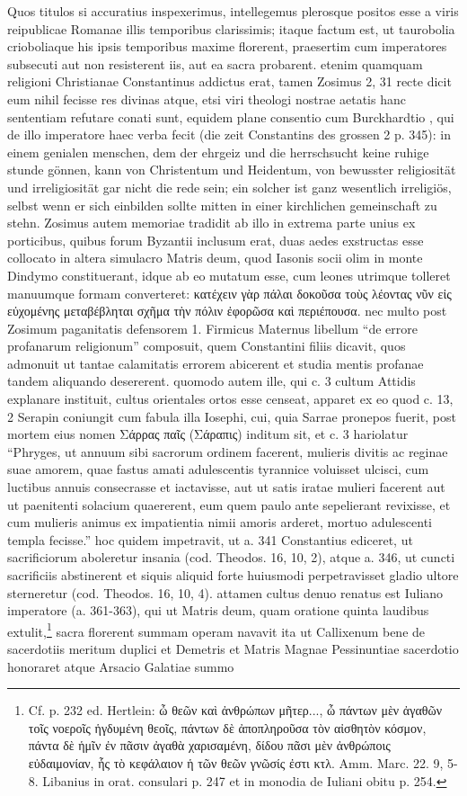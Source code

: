 \documentclass[a4paper, 11pt, oneside, polutonikogreek, german]{article}
\begin{document}
Quos titulos si accuratius inspexerimus, intellegemus plerosque positos esse a viris reipublicae Romanae illis temporibus clarissimis; itaque factum est, ut taurobolia crioboliaque his ipsis temporibus maxime florerent, praesertim cum imperatores subsecuti aut non resisterent iis, aut ea sacra probarent. etenim quamquam religioni Christianae Constantinus addictus erat, tamen Zosimus 2, 31 recte dicit eum nihil fecisse res divinas atque, etsi viri theologi nostrae aetatis hanc sententiam refutare conati sunt, equidem plane consentio cum Burckhardtio , qui de illo imperatore haec verba fecit (die zeit Constantins des grossen 2 p. 345): in einem genialen menschen, dem der ehrgeiz und die herrschsucht keine ruhige stunde gönnen, kann von Christentum und Heidentum, von bewusster religiosität und irreligiosität gar nicht die rede sein; ein solcher ist ganz wesentlich irreligiös, selbst wenn er sich einbilden sollte mitten in einer kirchlichen gemeinschaft zu stehn. Zosimus autem memoriae tradidit ab illo in extrema parte unius ex porticibus, quibus forum Byzantii inclusum erat, duas aedes exstructas esse collocato in altera simulacro Matris deum, quod Iasonis socii olim in monte Dindymo constituerant, idque ab eo mutatum esse, cum leones utrimque tolleret manuumque formam converteret: κατέχειν γὰρ πάλαι δοκοῦσα τοὺς λέοντας νῦν εἰς εὐχομένης μεταβέβληται σχῆμα τὴν πόλιν ἐφορῶσα καὶ περιέπουσα. nec multo post Zosimum paganitatis defensorem 1. Firmicus Maternus libellum "`de errore profanarum religionum"' composuit, quem Constantini filiis dicavit, quos admonuit ut tantae calamitatis errorem abicerent et studia mentis profanae tandem aliquando desererent. quomodo autem ille, qui c. 3 cultum Attidis explanare instituit, cultus orientales ortos esse censeat, apparet ex eo quod c. 13, 2 Serapin coniungit cum fabula illa Iosephi, cui, quia Sarrae pronepos fuerit, post mortem eius nomen Σάρρας παῖς (Σάραπις) inditum sit, et c. 3 hariolatur "`Phryges, ut annuum sibi sacrorum ordinem facerent, mulieris divitis ac reginae suae amorem, quae fastus amati adulescentis tyrannice voluisset ulcisci, cum luctibus annuis consecrasse et iactavisse, aut ut satis iratae mulieri facerent aut ut paenitenti solacium quaererent, eum quem paulo ante sepelierant revixisse, et cum mulieris animus ex impatientia nimii amoris arderet, mortuo adulescenti templa fecisse."' hoc quidem impetravit, ut a. 341 Constantius ediceret, ut sacrificiorum aboleretur insania (cod. Theodos. 16, 10, 2), atque a. 346, ut cuncti sacrificiis abstinerent et siquis aliquid forte huiusmodi perpetravisset gladio ultore sterneretur (cod. Theodos. 16, 10, 4). attamen cultus denuo renatus est Iuliano imperatore (a. 361-363), qui ut Matris deum, quam oratione quinta laudibus extulit,\footnote{Cf. p. 232 ed. Hertlein: ὦ θεῶν καὶ ἀνθρώπων μῆτερ..., ὦ πάντων μὲν ἀγαθῶν τοῖς νοεροῖς ἡγδυμένη θεοῖς, πάντων δὲ ἀποπληροῦσα τὸν αἰσθητὸν κόσμον, πάντα δὲ ἡμῖν ἐν πᾶσιν ἀγαθὰ χαρισαμένη, δίδου πᾶσι μὲν ἀνθρώποις εὐδαιμονίαν, ἧς τὸ κεφάλαιον ἡ τῶν θεῶν γνῶσίς ἐστι κτλ. Amm. Marc. 22. 9, 5-8. Libanius in orat. consulari p. 247 et in monodia de Iuliani obitu p. 254.} sacra florerent summam operam navavit ita ut Callixenum bene de sacerdotiis meritum duplici et Demetris et Matris Magnae Pessinuntiae sacerdotio honoraret atque Arsacio Galatiae summo 
\end{document}
